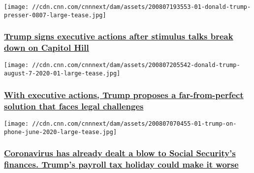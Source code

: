 \texttt{[image: //cdn.cnn.com/cnnnext/dam/assets/200807193553-01-donald-trump-presser-0807-large-tease.jpg]}

\hypertarget{trump-signs-executive-actions-after-stimulus-talks-break-down-on-capitol-hill-}{%
\subsubsection{\texorpdfstring{\href{/2020/08/08/politics/trump-executive-order-stimulus/index.html}{Trump
signs executive actions after stimulus talks break down on Capitol Hill
}}{Trump signs executive actions after stimulus talks break down on Capitol Hill }}\label{trump-signs-executive-actions-after-stimulus-talks-break-down-on-capitol-hill-}}

\href{/2020/08/08/politics/trump-democrats-stimulus-talks-stalled/index.html}{}

\texttt{[image: //cdn.cnn.com/cnnnext/dam/assets/200807205542-donald-trump-august-7-2020-01-large-tease.jpg]}

\hypertarget{with-executive-actions-trump-proposes-a-far-from-perfect-solution-that-faces-legal-challenges}{%
\subsubsection{\texorpdfstring{\href{/2020/08/08/politics/trump-democrats-stimulus-talks-stalled/index.html}{With
executive actions, Trump proposes a far-from-perfect solution that faces
legal
challenges}}{With executive actions, Trump proposes a far-from-perfect solution that faces legal challenges}}\label{with-executive-actions-trump-proposes-a-far-from-perfect-solution-that-faces-legal-challenges}}

\href{/2020/08/07/politics/social-security-medicare-trump-payroll-taxes/index.html}{}

\texttt{[image: //cdn.cnn.com/cnnnext/dam/assets/200807070455-01-trump-on-phone-june-2020-large-tease.jpg]}

\hypertarget{coronavirus-has-already-dealt-a-blow-to-social-securitys-finances-trumps-payroll-tax-holiday-could-make-it-worse}{%
\subsubsection{\texorpdfstring{\href{/2020/08/07/politics/social-security-medicare-trump-payroll-taxes/index.html}{Coronavirus
has already dealt a blow to Social Security's finances. Trump's payroll
tax holiday could make it
worse}}{Coronavirus has already dealt a blow to Social Security's finances. Trump's payroll tax holiday could make it worse}}\label{coronavirus-has-already-dealt-a-blow-to-social-securitys-finances-trumps-payroll-tax-holiday-could-make-it-worse}}

